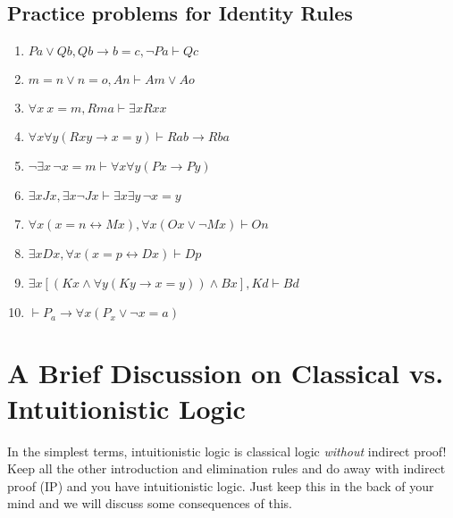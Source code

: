 \subsection{Practice problems for Identity Rules}
\begin{enumerate}
    \item $Pa \lor Qb, Qb \to b = c, \neg Pa \vdash Qc$
    \item $m = n \lor n = o, An \vdash Am \lor Ao$
    \item $\forall x \ x = m, Rma \vdash \exists x Rxx$
    \item $\forall x \forall y (Rxy \rightarrow x = y) \vdash R{ab} \to R{ba}$
    \item $\neg \exists x \, \neg x = m \vdash \forall x \forall y (Px \to Py)$
    \item $\exists x Jx, \exists x \neg Jx \vdash \exists x \exists y \, \neg x = y$
    \item $\forall x (x = n \leftrightarrow Mx), \forall x (Ox \lor \neg Mx) \vdash On$
    \item $\exists x Dx, \forall x (x = p \leftrightarrow Dx) \vdash Dp$
    \item $\exists x [(Kx \wedge \forall y (Ky \to x = y)) \wedge Bx], Kd \vdash Bd$
    \item $\vdash P_a \to \forall x (P_x \lor \neg x = a)$
\end{enumerate}
\newpage
\section{A Brief Discussion on Classical vs. Intuitionistic Logic}
In the simplest terms, intuitionistic logic is classical logic \textit{without} indirect proof! Keep all the other introduction and elimination rules and do away with indirect proof (IP) and you have intuitionistic logic. Just keep this in the back of your mind and we will discuss some consequences of this.



